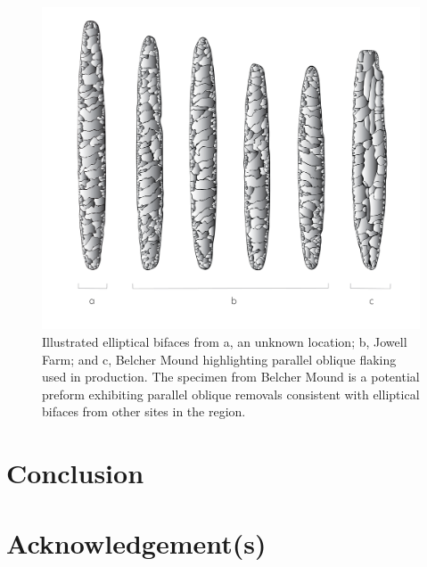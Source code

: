 \documentclass[]{interact}
\theoremstyle{plain}%
\theoremstyle{definition}
\theoremstyle{remark}
\begin{document}
\begin{figure}\centering
\includegraphics[width=0.9\linewidth]{figs/elliptical.illustration.png}
\caption{Illustrated elliptical bifaces from a, an unknown location; b, Jowell Farm; and c, Belcher Mound highlighting parallel oblique flaking used in production. The specimen from Belcher Mound is a potential preform exhibiting parallel oblique removals consistent with elliptical bifaces from other sites in the region.}
\label{fig:illustration}
\end{figure}

\hypertarget{conclusion}{%
\section{Conclusion}\label{conclusion}}

\hypertarget{acknowledgements}{%
\section*{Acknowledgement(s)}\label{acknowledgements}}
\end{document}
